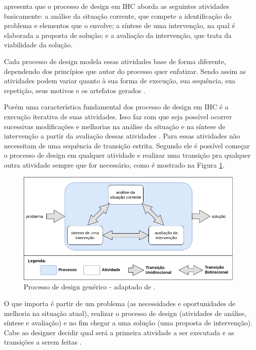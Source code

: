  apresenta que o processo de design em IHC aborda as seguintes atividades basicamente: a análise da situação corrente, que compete a identificação do problema e elementos que o envolve; a síntese de uma intervenção, na qual é elaborada a proposta de solução; e a avaliação da intervenção, que trata da viabilidade da solução. 

Cada processo de design modela essas atividades base de forma diferente, dependendo dos princípios que autor do processo quer enfatizar. Sendo assim as atividades podem variar quanto à sua forma de execução, sua sequência, sua repetição, seus motivos e os artefatos gerados \cite[p. 92, 99]{barbosa_silva}. %

Porém uma característica fundamental dos processo de design em IHC é a execução iterativa de suas atividades. Isso faz com que seja possível ocorrer sucessivas modificações e melhorias na análise da situação e na síntese de intervenção a partir da avaliação dessas atividades \cite{barbosa_silva}. Para  essas atividades não necessitam de uma sequência de transição estrita. Segundo ele é possível começar o processo de design em qualquer atividade e realizar uma transição pra qualquer outra atividade sempre que for necessário, como é mostrado na Figura \ref{Fig:design_process.png}. %

\begin{figure}[htbp]
	\centering
		\includegraphics[keepaspectratio=true,scale=0.5]{figuras/process_design.png}
	\caption{Processo de design genérico - adaptado de .}
	\label{Fig:design_process.png}
\end{figure}

O que importa é partir de um problema (as necessidades e oportunidades de melhoria na situação atual), realizar o processo de design (atividades de análise, síntese e avaliação) e no fim chegar a uma solução (uma proposta de intervenção). Cabe ao designer decidir qual será a primeira atividade a ser executada e as transições a serem feitas \cite[p. 100]{lawson2006}. %

